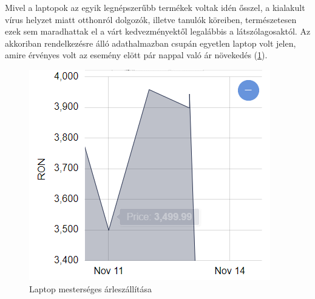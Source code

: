 Mivel a laptopok az egyik legnépszerűbb termékek voltak idén ősszel, a kialakult vírus helyzet miatt otthonról dolgozók, illetve tanulók köreiben, természetesen ezek sem maradhattak el a várt kedvezményektől legalábbis a látszólagosaktól. Az akkoriban rendelkezésre álló adathalmazban csupán egyetlen laptop volt jelen, amire érvényes volt az esemény elött pár nappal való ár növekedés (\ref{fig:laptop}).
\begin{figure}[H]
    \centering
    \includegraphics[scale=0.8]{figures/images/study/laptop_blackfriday.png}
    \caption{Laptop mesterséges árleszállítása}
    \label{fig:laptop}
\end{figure}